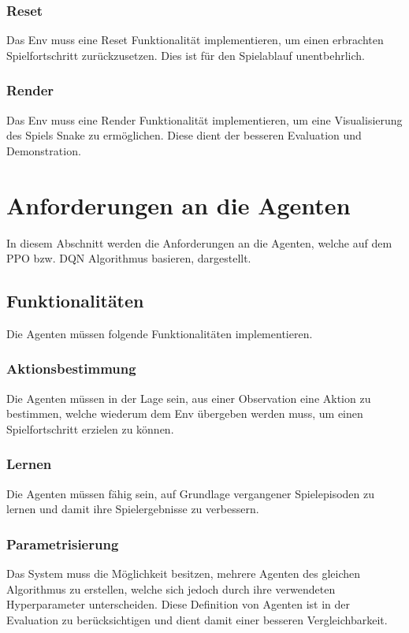 \subsubsection{Reset} \label{subsubsec:Anforderungen_Reset}
Das Env muss eine Reset Funktionalität implementieren, um einen erbrachten Spielfortschritt zurückzusetzen. Dies ist für den Spielablauf unentbehrlich.

\subsubsection{Render} \label{subsubsec:Anforderungen_Render}
Das Env muss eine Render Funktionalität implementieren, um eine Visualisierung des Spiels Snake zu ermöglichen. Diese dient der besseren Evaluation und Demonstration.

\section{Anforderungen an die Agenten} \label{sec:Anforderungen_Agenten}
In diesem Abschnitt werden die Anforderungen an die Agenten, welche auf dem PPO bzw. DQN Algorithmus basieren, dargestellt.

\subsection{Funktionalitäten} \label{subsec:Anforderungen_Funktionalitäten_Agent}
Die Agenten müssen folgende Funktionalitäten implementieren.

\subsubsection{Aktionsbestimmung} \label{subsubsec:Anforderungen_Aktionsbestimmung}
Die Agenten müssen in der Lage sein, aus einer Observation eine Aktion zu bestimmen, welche wiederum dem Env übergeben werden muss, um einen Spielfortschritt erzielen zu können.

\subsubsection{Lernen} \label{subsubsec:Anforderungen_Lernen}
Die Agenten müssen fähig sein, auf Grundlage vergangener Spielepisoden zu lernen und damit ihre Spielergebnisse zu verbessern.

\subsubsection{Parametrisierung} \label{subsubsec:Anforderungen_Parametrisierung}
Das System muss die Möglichkeit besitzen, mehrere Agenten des gleichen Algorithmus zu erstellen, welche sich jedoch durch ihre verwendeten Hyperparameter unterscheiden. Diese Definition von Agenten ist in der Evaluation zu berücksichtigen und dient damit einer besseren Vergleichbarkeit.

